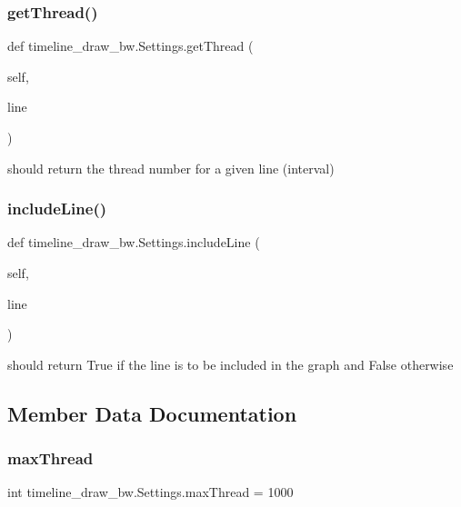 \subsubsection{\texorpdfstring{get\+Thread()}{getThread()}}
{\footnotesize\ttfamily def timeline\+\_\+draw\+\_\+bw.\+Settings.\+get\+Thread (\begin{DoxyParamCaption}\item[{}]{self,  }\item[{}]{line }\end{DoxyParamCaption})}



should return the thread number for a given line (interval) 

\mbox{\label{classtimeline__draw__bw_1_1Settings_a572fa3777fd6842b68033807657afe1d}} 
\subsubsection{\texorpdfstring{include\+Line()}{includeLine()}}
{\footnotesize\ttfamily def timeline\+\_\+draw\+\_\+bw.\+Settings.\+include\+Line (\begin{DoxyParamCaption}\item[{}]{self,  }\item[{}]{line }\end{DoxyParamCaption})}



should return True if the line is to be included in the graph and False otherwise 



\subsection{Member Data Documentation}
\mbox{\label{classtimeline__draw__bw_1_1Settings_a941a3030f430ef7defb2cfde3045c504}} 
\subsubsection{\texorpdfstring{max\+Thread}{maxThread}}
{\footnotesize\ttfamily int timeline\+\_\+draw\+\_\+bw.\+Settings.\+max\+Thread = 1000\hspace{0.3cm}{\ttfamily [static]}}

